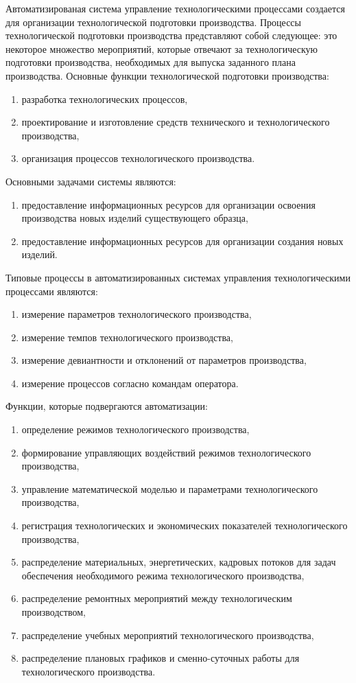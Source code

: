 Автоматизированая система управление технологическими процессами создается для организации технологической подготовки производства. Процессы технологической подготовки производства представляют собой следующее: это некоторое множество мероприятий, которые отвечают за технологическую подготовки производства, необходимых для выпуска заданного плана производства.
Основные функции технологической подготовки производства:
\begin{enumerate}
	\item разработка технологических процессов,
	\item проектирование и изготовление средств технического и технологического производства,
	\item организация процессов технологического производства.
\end{enumerate}
Основными задачами системы являются:
\begin{enumerate}
	\item предоставление информационных ресурсов для организации освоения производства новых изделий существующего образца,
	\item предоставление информационных ресурсов для организации создания новых изделий.
\end{enumerate}
Типовые процессы в автоматизированных системах управления технологическими процессами являются:
\begin{enumerate}
	\item измерение параметров технологического производства,
	\item измерение темпов технологического производства,
	\item измерение девиантности и отклонений от параметров производства,
	\item измерение процессов согласно командам оператора.
\end{enumerate}
Функции, которые подвергаются автоматизации:
\begin{enumerate}
	\item определение режимов технологического производства,
	\item формирование управляющих воздействий режимов технологического производства,
	\item управление математической моделью и параметрами технологического производства,
	\item регистрация технологических и экономических показателей технологического производства,
	\item распределение материальных, энергетических, кадровых потоков для задач обеспечения необходимого режима технологического производства,
	\item распределение ремонтных мероприятий между технологическим производством,
	\item распределение учебных мероприятий технологического производства,
	\item распределение плановых графиков и сменно-суточных работы для технологического производства.
\end{enumerate}
